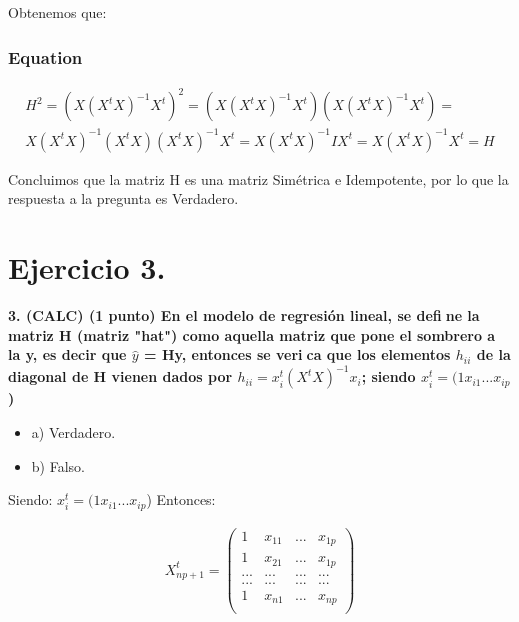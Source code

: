 \documentclass[12pt,spanish]{article}
\begin{document}
    Obtenemos que:\\
    
	\section*{Equation}			
	\begin{equation}
	\begin{aligned}
	H^2 =  (X (X^t X)^{-1}  X^t)^2 =(X (X^t X)^{-1}  X^t)(X (X^t X)^{-1}  X^t)= \\
	X (X^t X)^{-1}  (X^t X) (X^t X)^{-1}  X^t = X (X^t X)^{-1} I X^t = X (X^t X)^{-1} X^t = H
 	\end{aligned}
	\end{equation}	
	
	Concluimos que la matriz H es una matriz Simétrica e Idempotente, por lo que la respuesta a la pregunta es Verdadero.
	
\part*{Ejercicio 3.}	
		\textbf{3. (CALC) (1 punto) En el modelo de regresión lineal, se define la matriz H (matriz "hat") como aquella matriz que pone el sombrero a la y, es decir que $\hat{y}$ = Hy, entonces se verica que los elementos $h_{ii}$ de la diagonal de H vienen dados por $h_{ii} = x_i^t (X^t X)^{-1} x_i$; siendo $x_i^t = (1 x_{i1} . . . x_{ip}$)}
	
	
	\begin{itemize}
		\item a) Verdadero.
		\item b) Falso.
	\end{itemize}
	
	
 Siendo: 	$x_i^t = (1 x_{i1} . . . x_{ip}$)
 Entonces: 

 	\begin{equation}
		\begin{aligned}
		X_{np+1}^t =
\begin{pmatrix}
1 & x_{11} & . . .& x_{1p} \\
1 & x_{21} & . . .& x_{1p}\\
... & ...& ...   & ...\\
... & ...&  ...  &  ...\\
1 & x_{n1} & . . .& x_{np}\\
\end{pmatrix}
 	\end{aligned}
	\end{equation}
	
\end{document}
